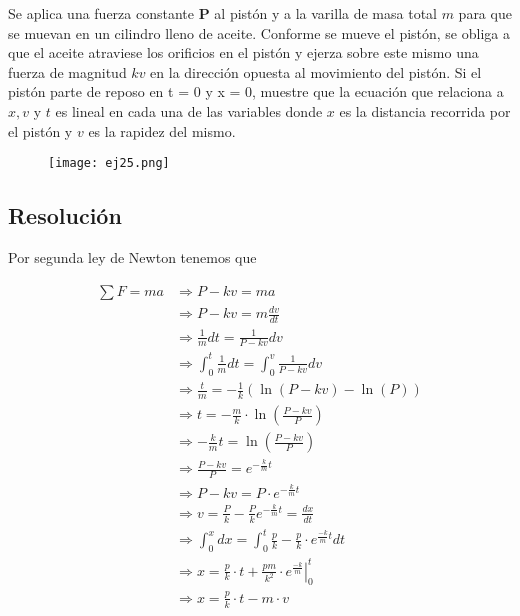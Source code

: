 \documentclass[11pt]{article}
\begin{document}
Se aplica una fuerza constante \textbf{P} al pistón y a la varilla de masa total
$m$ para que se muevan en un cilindro lleno de aceite. Conforme se mueve el
pistón, se obliga a que el aceite atraviese los orificios en el pistón y ejerza
sobre este mismo una fuerza de magnitud $kv$ en la dirección opuesta al
movimiento del pistón. Si el pistón parte de reposo en t = 0 y x = 0, muestre
que la ecuación que relaciona a $x, v$ y $t$ es lineal en cada una de las
variables donde $x$ es la distancia recorrida por el pistón y $v$ es la rapidez
del mismo.

\begin{figure}[h!]
  \begin{center}
    \texttt{[image: ej25.png]}
  \end{center}
\end{figure}

\subsection*{Resolución}

Por segunda ley de Newton tenemos que

\begin{align*}
  \sum F = ma &\Rightarrow P - kv = ma \\
  &\Rightarrow P - kv = m \frac{dv}{dt} \\ %
  &\Rightarrow \frac{1}{m}dt = \frac{1}{P - kv}dv \\
  &\Rightarrow \int_{0}^{t} \frac{1}{m}dt = \int_{0}^{v} \frac{1}{P - kv}dv \\ %
  &\Rightarrow \frac{t}{m} = -\frac{1}{k}(\ln{(P - kv)} - \ln{(P)}) \\
  &\Rightarrow t = -\frac{m}{k} \cdot \ln{\left(\frac{P - kv}{P}\right)} \\
  &\Rightarrow -\frac{k}{m}t = \ln{\left(\frac{P - kv}{P}\right)} \\
  &\Rightarrow \frac{P - kv}{P} = e^{-\frac{k}{m}t} \\
  &\Rightarrow P - kv = P \cdot e^{-\frac{k}{m}t} \\
  &\Rightarrow v = \frac{P}{k} - \frac{P}{k}e^{-\frac{k}{m}t} = \frac{dx}{dt} \\ %
  &\Rightarrow \int_{0}^{x} dx = \int_{0}^{t} \frac{p}{k} - \frac{p}{k} \cdot e^{\frac{-k}{m} t}dt \\
  &\Rightarrow x = \left. \frac{p}{k} \cdot t + \frac{pm}{k^2} \cdot e^{\frac{-k}{m}} \right\vert_0^t \\
  &\Rightarrow x = \frac{p}{k} \cdot t - m \cdot v %
\end{align*}
\end{document}
